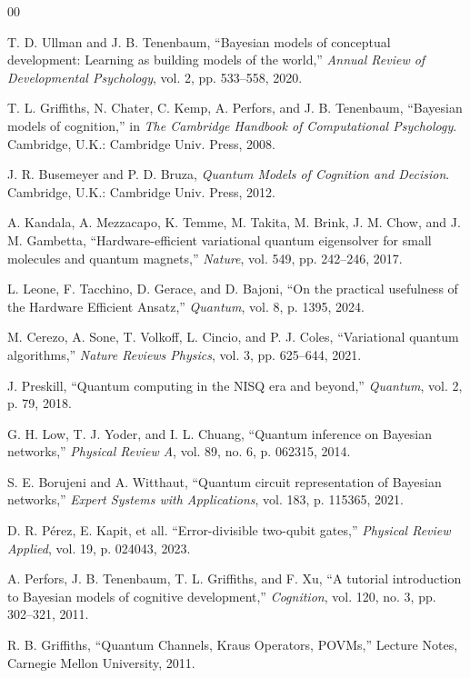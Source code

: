 \documentclass[conference]{IEEEtran}
\begin{document}
\begin{thebibliography}{00}

T. D. Ullman and J. B. Tenenbaum, 
``Bayesian models of conceptual development: Learning as building models of the world,'' 
\textit{Annual Review of Developmental Psychology}, vol. 2, pp. 533--558, 2020.

T. L. Griffiths, N. Chater, C. Kemp, A. Perfors, and J. B. Tenenbaum,
``Bayesian models of cognition,'' 
in \textit{The Cambridge Handbook of Computational Psychology}. 
Cambridge, U.K.: Cambridge Univ. Press, 2008.

J. R. Busemeyer and P. D. Bruza, 
\textit{Quantum Models of Cognition and Decision}. 
Cambridge, U.K.: Cambridge Univ. Press, 2012.

A. Kandala, A. Mezzacapo, K. Temme, M. Takita, M. Brink, J. M. Chow, and J. M. Gambetta, 
``Hardware-efficient variational quantum eigensolver for small molecules and quantum magnets,''
\textit{Nature}, vol. 549, pp. 242--246, 2017.

L. Leone, F. Tacchino, D. Gerace, and D. Bajoni, 
``On the practical usefulness of the Hardware Efficient Ansatz,'' 
\textit{Quantum}, vol. 8, p. 1395, 2024.

M. Cerezo, A. Sone, T. Volkoff, L. Cincio, and P. J. Coles,
``Variational quantum algorithms,'' 
\textit{Nature Reviews Physics}, vol. 3, pp. 625--644, 2021.

J. Preskill, 
``Quantum computing in the NISQ era and beyond,'' 
\textit{Quantum}, vol. 2, p. 79, 2018.

G. H. Low, T. J. Yoder, and I. L. Chuang, 
``Quantum inference on Bayesian networks,'' 
\textit{Physical Review A}, vol. 89, no. 6, p. 062315, 2014.

S. E. Borujeni and A. Witthaut, 
``Quantum circuit representation of Bayesian networks,'' 
\textit{Expert Systems with Applications}, vol. 183, p. 115365, 2021.

D. R. Pérez, E. Kapit, et all.
``Error-divisible two-qubit gates,'' 
\textit{Physical Review Applied}, vol. 19, p. 024043, 2023.

A. Perfors, J. B. Tenenbaum, T. L. Griffiths, and F. Xu,
``A tutorial introduction to Bayesian models of cognitive development,'' 
\textit{Cognition}, vol. 120, no. 3, pp. 302--321, 2011.

R. B. Griffiths, 
``Quantum Channels, Kraus Operators, POVMs,'' 
Lecture Notes, Carnegie Mellon University, 2011.


\end{thebibliography}
\end{document}
